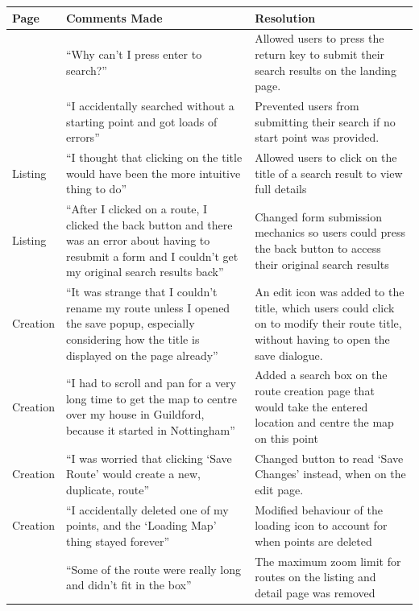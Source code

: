 \begin{tabular}{p{1.5cm}|p{6.25cm}|p{6.25cm}}
	\hline 
	\textbf{Page} & \textbf{Comments Made} & \textbf{Resolution} \\
	\hline 
	\lbrcell{Landing} & ``Why can't I press enter to search?'' & Allowed users to press the return key to submit their search results on the landing page.\\
	\hline
	\lbrcell{Landing} & ``I accidentally searched without a starting point and got loads of errors'' & Prevented users from submitting their search if no start point was provided.\\
	\hline	
	Listing & ``I thought that clicking on the title would have been the more intuitive thing to do'' & Allowed users to click on the title of a search result to view full details\\
	\hline	
	Listing & ``After I clicked on a route, I clicked the back button and there was an error about having to resubmit a form and I couldn't get my original search results back'' & Changed form submission mechanics so users could press the back button to access their original search results\\
	\hline		
	Creation & ``It was strange that I couldn't rename my route unless I opened the save popup, especially considering how the title is displayed on the page already'' & An edit icon was added to the title, which users could click on to modify their route title, without having to open the save dialogue.\\
	\hline
	Creation & ``I had to scroll and pan for a very long time to get the map to centre over my house in Guildford, because it started in Nottingham'' & Added a search box on the route creation page that would take the entered location and centre the map on this point\\ 
	\hline
	Creation & ``I was worried that clicking `Save Route' would create a new, duplicate, route'' & Changed button to read `Save Changes' instead, when on the edit page. \\
	\hline
	Creation & ``I accidentally deleted one of my points, and the `Loading Map' thing stayed forever'' & Modified behaviour of the loading icon to account for when points are deleted\\
	\hline
	\lbrcell{Listing} & ``Some of the route were really long and didn't fit in the box'' & The maximum zoom limit for routes on the listing and detail page was removed\\
		\hline
\end{tabular}


	